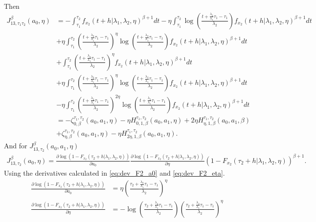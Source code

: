 \documentclass{article}
\begin{document}
Then
\begin{align*}
J_{13,\tau_1\tau_2}^{\beta}(a_0,\eta)&=-\int_{\tau_1}^{\tau_2}f_{x_2}(t+h|\lambda_1,\lambda_2,\eta)^{\beta+1}dt
-\eta \int_{\tau_1}^{\tau_2}\log\left(\frac{t+\frac{\lambda_2}{\lambda_1}\tau_1-\tau_1}{\lambda_2}\right)f_{x_2}(t+h|\lambda_1,\lambda_2,\eta)^{\beta+1}dt
\\
&+\eta \int_{\tau_1}^{\tau_2}\left(\frac{t+\frac{\lambda_2}{\lambda_1}\tau_1-\tau_1}{\lambda_2}\right)^{\eta}\log\left(\frac{t+\frac{\lambda_2}{\lambda_1}\tau_1-\tau_1}{\lambda_2}\right)f_{x_2}(t+h|\lambda_1,\lambda_2,\eta)^{\beta+1}dt
\\
&+\int_{\tau_1}^{\tau_2}\left(\frac{t+\frac{\lambda_2}{\lambda_1}\tau_1-\tau_1}{\lambda_2}\right)^{\eta}f_{x_2}(t+h|\lambda_1,\lambda_2,\eta)^{\beta+1}dt
\\
&+\eta\int_{\tau_1}^{\tau_2}\left(\frac{t+\frac{\lambda_2}{\lambda_1}\tau_1-\tau_1}{\lambda_2}\right)^{\eta}\log\left(\frac{t+\frac{\lambda_2}{\lambda_1}\tau_1-\tau_1}{\lambda_2}\right)f_{x_2}(t+h|\lambda_1,\lambda_2,\eta)^{\beta+1}dt
\\
&-\eta\int_{\tau_1}^{\tau_2}\left(\frac{t+\frac{\lambda_2}{\lambda_1}\tau_1-\tau_1}{\lambda_2}\right)^{2\eta}\log\left(\frac{t+\frac{\lambda_2}{\lambda_1}\tau_1-\tau_1}{\lambda_2}\right)f_{x_2}(t+h|\lambda_1,\lambda_2,\eta)^{\beta+1}dt
\\
&=-\zeta_{0,\beta}^{\tau_1,\tau_2}(a_0,a_1,\eta)-\eta H_{0,1,\beta}^{\tau_1,\tau_2}(a_0,a_1,\eta)+2\eta H_{\eta,1,\beta}^{\tau_1,\tau_2}(a_0,a_1,\beta)
\\
&+\zeta_{\eta,\beta}^{\tau_1,\tau_2}(a_0,a_1,\eta)-\eta H_{2\eta,1,\beta}^{\tau_1,\tau_2}(a_0,a_1,\eta).
\end{align*}
And for $J_{13,\tau_2}^{\beta}(a_0,a_1,\eta)$
\begin{align*}
J_{13,\tau_2}^{\beta}(a_0,\eta)=\frac{\partial \log\left(1-F_{x_2}(\tau_2+h|\lambda_1,\lambda_2,\eta)\right)}{\partial a_0}\frac{\partial \log\left(1-F_{x_2}(\tau_2+h|\lambda_1,\lambda_2,\eta)\right)}{\partial \eta}\left(1-F_{x_2}(\tau_2+h|\lambda_1,\lambda_2,\eta)\right)^{\beta+1}.
\end{align*}
Using the derivatives calculated in  \ref{eq:dev_F2_a0} and \ref{eq:dev_F2_eta}.
\begin{align*}
\frac{\partial \log\left(1-F_{x_2}(\tau_2+h|\lambda_1,\lambda_2,\eta)\right)}{\partial a_0}&=\eta\left(\frac{\tau_2+\frac{\lambda_2}{\lambda_1}\tau_1-\tau_1}{\lambda_2}\right)^{\eta}
\\
\frac{\partial \log\left(1-F_{x_2}(\tau_2+h|\lambda_1,\lambda_2,\eta)\right)}{\partial \eta}&=-\log\left(\frac{\tau_2+\frac{\lambda_2}{\lambda_1}\tau_1-\tau_1}{\lambda_2}\right)\left(\frac{\tau_2+\frac{\lambda_2}{\lambda_1}\tau_1-\tau_1}{\lambda_2}\right)^{\eta}
\end{align*}
\end{document}
